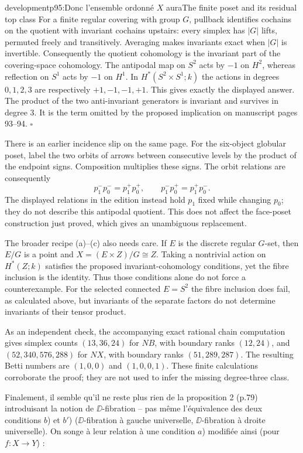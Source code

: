 \begin{dcomment}{development}{p95:Donc l'ensemble ordonné $X$ aura}{The finite poset and its residual top class}
For a finite regular covering with group $G$, pullback identifies cochains on the quotient with invariant cochains upstairs: every simplex has $|G|$ lifts, permuted freely and transitively. Averaging makes invariants exact when $|G|$ is invertible. Consequently the quotient cohomology is the invariant part of the covering-space cohomology. The antipodal map on $S^2$ acts by $-1$ on $H^2$, whereas reflection on $S^1$ acts by $-1$ on $H^1$. In $H^*(S^2\times S^1;k)$ the actions in degrees $0,1,2,3$ are respectively $+1,-1,-1,+1$. This gives exactly the displayed answer. The product of the two anti-invariant generators is invariant and survives in degree $3$. It is the term omitted by the proposed implication on manuscript pages 93--94. \hfill$\square$

There is an earlier incidence slip on the same page. For the six-object globular poset, label the two orbits of arrows between consecutive levels by the product of the endpoint signs. Composition multiplies these signs. The orbit relations are consequently
\[
 p_1^-p_0^-=p_1^+p_0^+,
 \qquad p_1^-p_0^+=p_1^+p_0^-.
\]
The displayed relations in the edition instead hold $p_1$ fixed while changing $p_0$; they do not describe this antipodal quotient. This does not affect the face-poset construction just proved, which gives an unambiguous replacement.

The broader recipe (a)--(c) also needs care. If $E$ is the discrete regular $G$-set, then $E/G$ is a point and $X=(E\times Z)/G\cong Z$. Taking a nontrivial action on $H^*(Z;k)$ satisfies the proposed invariant-cohomology conditions, yet the fibre inclusion is the identity. Thus those conditions alone do not force a counterexample. For the selected connected $E=S^2$ the fibre inclusion does fail, as calculated above, but invariants of the separate factors do not determine invariants of their tensor product.

As an independent check, the accompanying exact rational chain computation gives simplex counts $(13,36,24)$ for $NB$, with boundary ranks $(12,24)$, and $(52,340,576,288)$ for $NX$, with boundary ranks $(51,289,287)$. The resulting Betti numbers are $(1,0,0)$ and $(1,0,0,1)$. These finite calculations corroborate the proof; they are not used to infer the missing degree-three class.
\end{dcomment}



Finalement, il semble qu’il ne reste plus rien de la proposition 2 (p.79) introduisant la notion de $\DD$-fibration – pas même l’équivalence des deux conditions $b$) et $b'$) ($\DD$-fibration à gauche universelle, $\DD$-fibration à droite universelle). On songe à leur relation à une condition $a$) modifiée ainsi (pour $f : X \to Y$) :

